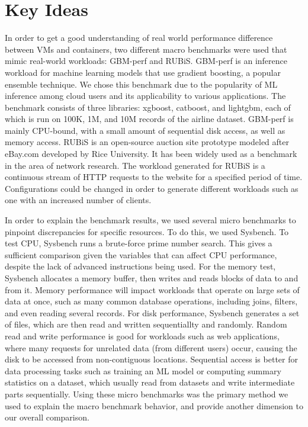 \documentclass[11pt]{article}
\begin{document}
\vspace{3mm} %


\section{Key Ideas}

In order to get a good understanding of real world performance difference between VMs and containers, two different macro benchmarks were used that mimic real-world workloads: GBM-perf and RUBiS. GBM-perf is an inference workload for machine learning models that use gradient boosting, a popular ensemble technique. We chose this benchmark due to the popularity of ML inference among cloud users and its applicability to various applications. The benchmark consists of three libraries: xgboost, catboost, and lightgbm, each of which is run on 100K, 1M, and 10M records of the airline dataset. GBM-perf is mainly CPU-bound, with a small amount of sequential disk access, as well as memory access. RUBiS is an open-source auction site prototype modeled after eBay.com developed by Rice University. It has been widely used as a benchmark in the area of network research. The workload generated for RUBiS is a continuous stream of HTTP requests to the website for a specified period of time. Configurations could be changed in order to generate different workloads such as one with an increased number of clients.

In order to explain the benchmark results, we used several micro benchmarks to pinpoint discrepancies for specific resources. To do this, we used Sysbench. To test CPU, Sysbench runs a brute-force prime number search. This gives a sufficient comparison given the variables that can affect CPU performance, despite the lack of advanced instructions being used. For the memory test, Sysbench allocates a memory buffer, then writes and reads blocks of data to and from it. Memory performance will impact workloads that operate on large sets of data at once, such as many common database operations, including joins, filters, and even reading several records. For disk performance, Sysbench generates a set of files, which are then read and written sequentiallty and randomly. Random read and write performance is good for workloads such as web applications, where many requests for unrelated data (from different users) occur, causing the disk to be accessed from non-contiguous locations. Sequential access is better for data processing tasks such as training an ML model or computing summary statistics on a dataset, which usually read from datasets and write intermediate parts sequentially. Using these micro benchmarks was the primary method we used to explain the macro benchmark behavior, and provide another dimension to our overall comparison.
\end{document}
